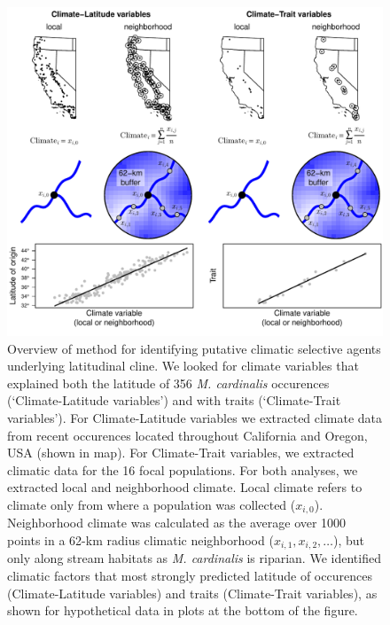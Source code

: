 \documentclass[11pt, oneside]{article}
\begin{document}

\begin{figure}[h!]
	\centerline{\includegraphics[width=1\textwidth]{Figures/Figure_VarSelect.pdf}}
	\fontsize{10}{12}
	\selectfont
	\caption[Climatic variable selection]{Overview of method for identifying putative climatic selective agents underlying latitudinal cline. We looked for climate variables that explained both the latitude of 356 \textit{M. cardinalis} occurences (`Climate-Latitude variables') and with traits (`Climate-Trait variables'). For Climate-Latitude variables we extracted climate data from recent occurences located throughout California and Oregon, USA (shown in map). For Climate-Trait variables, we extracted climatic data for the 16 focal populations. For both analyses, we extracted local and neighborhood climate. Local climate refers to climate only from where a population was collected ($x_{i,0}$). Neighborhood climate was calculated as the average over 1000 points in a 62-km radius climatic neighborhood ($x_{i,1}, x_{i,2}, \dots$), but only along stream habitats as \textit{M. cardinalis} is riparian. We identified climatic factors that most strongly predicted latitude of occurences (Climate-Latitude variables) and traits (Climate-Trait variables), as shown for hypothetical data in plots at the bottom of the figure.}
	\label{fig:Fig_VarSelect}
\end{figure}
\end{document}

